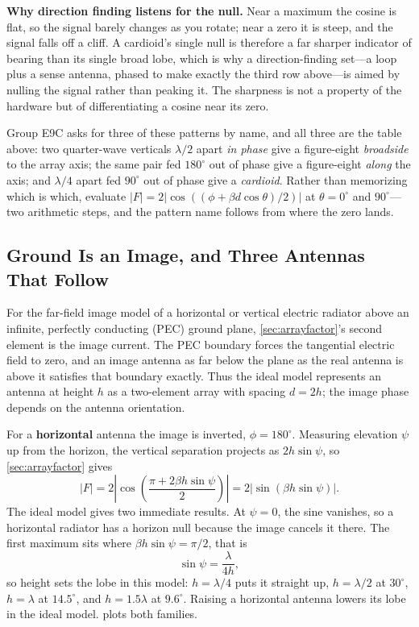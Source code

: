 \begin{physicalbox}
\textbf{Why direction finding listens for the null.} Near a maximum the cosine is
flat, so the signal barely changes as you rotate; near a zero it is steep, and the
signal falls off a cliff. A cardioid's single null is therefore a far sharper
indicator of bearing than its single broad lobe, which is why a direction-finding
set---a loop plus a sense antenna, phased to make exactly the third row above---is
aimed by nulling the signal rather than peaking it. The sharpness is not a property of
the hardware but of differentiating a cosine near its zero.
\end{physicalbox}

\begin{exambox}
Group E9C asks for three of these patterns by name, and all three are the table above:
two quarter-wave verticals \(\lambda/2\) apart \emph{in phase} give a figure-eight
\emph{broadside} to the array axis; the same pair fed \(180^\circ\) out of phase give
a figure-eight \emph{along} the axis; and \(\lambda/4\) apart fed \(90^\circ\) out of
phase give a \emph{cardioid}. Rather than memorizing which is which, evaluate
\(|F|=2|\cos((\phi+\beta d\cos\theta)/2)|\) at \(\theta=0^\circ\) and
\(90^\circ\)---two arithmetic steps, and the pattern name follows from where the zero
lands.
\end{exambox}

\subsection{Ground Is an Image, and Three Antennas That Follow}
\label{sec:groundimage}
For the far-field image model of a horizontal or vertical electric radiator above an
infinite, perfectly conducting (PEC) ground plane, \cref{sec:arrayfactor}'s second
element is the image current. The PEC boundary forces the tangential electric field
to zero, and an image antenna as far below the plane as the real antenna is above it
satisfies that boundary exactly. Thus the ideal model represents an antenna at height
\(h\) as a two-element array with spacing \(d=2h\); the image phase depends on the
antenna orientation.

For a \textbf{horizontal} antenna the image is inverted, \(\phi=180^\circ\). Measuring
elevation \(\psi\) up from the horizon, the vertical separation projects as
\(2h\sin\psi\), so \cref{sec:arrayfactor} gives
\[
|F|=2\left|\cos\!\left(\frac{\pi+2\beta h\sin\psi}{2}\right)\right|
=2\left|\sin\left(\beta h\sin\psi\right)\right| .
\]
The ideal model gives two immediate results. At \(\psi=0\), the sine vanishes, so a
horizontal radiator has a horizon null because the image cancels it there. The first
maximum sits where \(\beta h\sin\psi=\pi/2\), that is
\[
\sin\psi=\frac{\lambda}{4h},
\]
so height sets the lobe in this model: \(h=\lambda/4\) puts it straight up,
\(h=\lambda/2\) at \(30^\circ\), \(h=\lambda\) at \(14.5^\circ\), and
\(h=1.5\lambda\) at \(9.6^\circ\). Raising a horizontal antenna lowers its lobe
in the ideal model.  plots both families.

